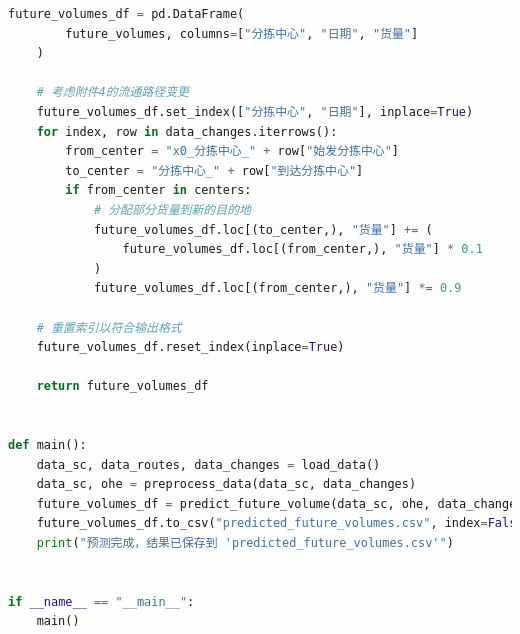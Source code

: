 \documentclass[UTF8,a4paper,10 pt]{article}%
\begin{document}
\begin{lstlisting}[language=python]
    future_volumes_df = pd.DataFrame(
        future_volumes, columns=["分拣中心", "日期", "货量"]
    )

    # 考虑附件4的流通路径变更
    future_volumes_df.set_index(["分拣中心", "日期"], inplace=True)
    for index, row in data_changes.iterrows():
        from_center = "x0_分拣中心_" + row["始发分拣中心"]
        to_center = "分拣中心_" + row["到达分拣中心"]
        if from_center in centers:
            # 分配部分货量到新的目的地
            future_volumes_df.loc[(to_center,), "货量"] += (
                future_volumes_df.loc[(from_center,), "货量"] * 0.1
            )
            future_volumes_df.loc[(from_center,), "货量"] *= 0.9

    # 重置索引以符合输出格式
    future_volumes_df.reset_index(inplace=True)

    return future_volumes_df


def main():
    data_sc, data_routes, data_changes = load_data()
    data_sc, ohe = preprocess_data(data_sc, data_changes)
    future_volumes_df = predict_future_volume(data_sc, ohe, data_changes)
    future_volumes_df.to_csv("predicted_future_volumes.csv", index=False)
    print("预测完成，结果已保存到 'predicted_future_volumes.csv'")


if __name__ == "__main__":
    main()
\end{lstlisting}
\end{document}
